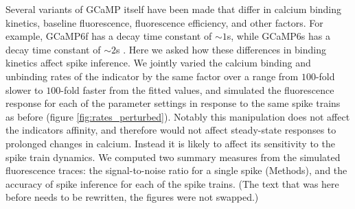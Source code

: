 \documentclass[a4paper,12pt]{article}
\theoremstyle{definition}
\begin{document}
Several variants of GCaMP itself have been made that differ in calcium binding kinetics, baseline fluorescence, fluorescence efficiency, and other factors. For example, GCaMP6f has a decay time constant of $\sim 1$s, while GCaMP6s has a decay time constant of $\sim 2$s \cite{chen}. Here we asked how these differences in binding kinetics affect spike inference. We jointly varied the calcium binding and unbinding rates of the indicator by the same factor over a range from $100$-fold slower to $100$-fold faster from the fitted values, and simulated the fluorescence response for each of the parameter settings in response to the same spike trains as before (figure \ref{fig:rates_perturbed}). Notably this manipulation does not affect the indicators affinity, and therefore would not affect steady-state responses to prolonged changes in calcium. Instead it is likely to affect its sensitivity to the spike train dynamics. We computed two summary measures from the simulated fluorescence traces: the signal-to-noise ratio for a single spike (Methods), and the accuracy of spike inference for each of the spike trains. (The text that was here before needs to be rewritten, the figures were not swapped.)
\end{document}
